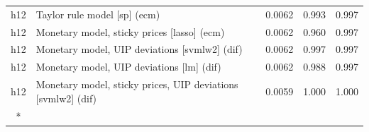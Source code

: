 \begin{ThreePartTable}
\begin{longtable}[t]{cp{5.5cm}ccc}
h12 & \raggedright Taylor rule model [sp] (ecm) & 0.0062 & 0.993 & 0.997\\
h12 & \raggedright Monetary model, sticky prices [lasso] (ecm) & 0.0062 & 0.960 & 0.997\\
h12 & \raggedright Monetary model, UIP deviations [svmlw2] (dif) & 0.0062 & 0.997 & 0.997\\
h12 & \raggedright Monetary model, UIP deviations [lm] (dif) & 0.0062 & 0.988 & 0.997\\
h12 & \raggedright Monetary model, sticky prices, UIP deviations [svmlw2] (dif) & 0.0059 & 1.000 & 1.000\\*
\end{longtable}
\end{ThreePartTable}
\endgroup{}
